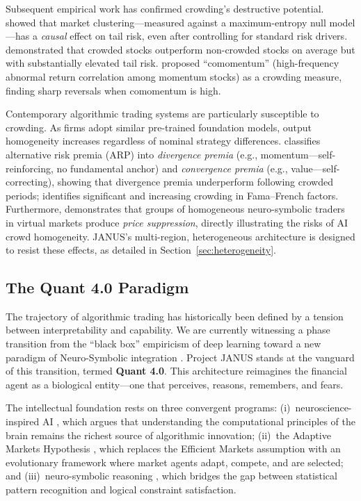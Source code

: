 \documentclass[12pt, a4paper]{article}
\begin{document}
Subsequent empirical work has confirmed crowding's destructive potential.
\citet{vankralingen2021crowded} showed that market clustering---measured against a maximum-entropy null model---has a \textit{causal} effect on tail risk, even after controlling for standard risk drivers.
\citet{brown2022crowded} demonstrated that crowded stocks outperform non-crowded stocks on average but with substantially elevated tail risk.
\citet{lou2022comomentum} proposed ``comomentum'' (high-frequency abnormal return correlation among momentum stocks) as a crowding measure, finding sharp reversals when comomentum is high.

Contemporary algorithmic trading systems are particularly susceptible to crowding. As firms adopt similar pre-trained foundation models, output homogeneity increases regardless of nominal strategy differences. \citet{baltas2019arp} classifies alternative risk premia (ARP) into \textit{divergence premia} (e.g., momentum---self-reinforcing, no fundamental anchor) and \textit{convergence premia} (e.g., value---self-correcting), showing that divergence premia underperform following crowded periods; \citet{volpati2020zooming} identifies significant and increasing crowding in Fama--French factors. Furthermore, \citet{stillman2024neurosymbolic} demonstrates that groups of homogeneous neuro-symbolic traders in virtual markets produce \textit{price suppression}, directly illustrating the risks of AI crowd homogeneity. JANUS's multi-region, heterogeneous architecture is designed to resist these effects, as detailed in Section~\ref{sec:heterogeneity}.

\subsection{The Quant 4.0 Paradigm}
\label{sec:quant4}

The trajectory of algorithmic trading has historically been defined by a tension between interpretability and capability.
We are currently witnessing a phase transition from the ``black box'' empiricism of deep learning \citep{lecun2015deep} toward a new paradigm of Neuro-Symbolic integration \citep{marra2024neurosymbolic, garcez2023neurosymbolic}.
Project JANUS stands at the vanguard of this transition, termed \textbf{Quant 4.0}.
This architecture reimagines the financial agent as a biological entity---one that perceives, reasons, remembers, and fears.

The intellectual foundation rests on three convergent programs:
(i)~neuroscience-inspired AI \citep{hassabis2017neuroscience}, which argues that understanding the computational principles of the brain remains the richest source of algorithmic innovation;
(ii)~the Adaptive Markets Hypothesis \citep{lo2004adaptive, lo2017adaptive}, which replaces the Efficient Markets assumption with an evolutionary framework where market agents adapt, compete, and are selected; and
(iii)~neuro-symbolic reasoning \citep{garcez2023neurosymbolic, badreddine2022logic}, which bridges the gap between statistical pattern recognition and logical constraint satisfaction.
\end{document}
